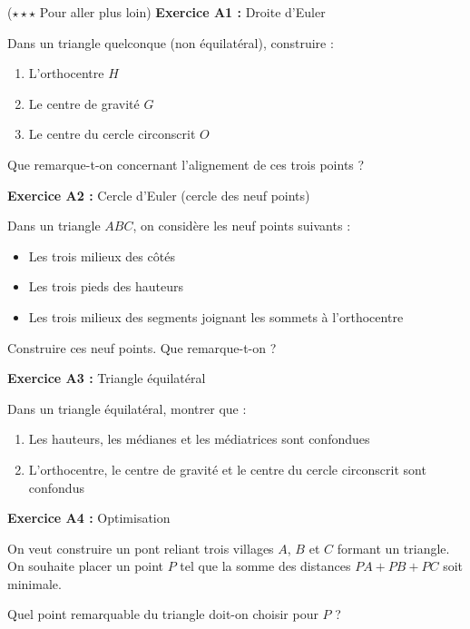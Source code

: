 \begin{exercisebox}[Approfondissement] ($\star\star\star$ Pour aller plus loin)
	\textbf{Exercice A1 :} Droite d'Euler

	Dans un triangle quelconque (non équilatéral), construire :
	\begin{enumerate}[label=\alph*)]
		\item L'orthocentre $H$
		\item Le centre de gravité $G$
		\item Le centre du cercle circonscrit $O$
	\end{enumerate}

	Que remarque-t-on concernant l'alignement de ces trois points ?


	\medskip

	\textbf{Exercice A2 :} Cercle d'Euler (cercle des neuf points)

	Dans un triangle $ABC$, on considère les neuf points suivants :
	\begin{itemize}
		\item Les trois milieux des côtés
		\item Les trois pieds des hauteurs
		\item Les trois milieux des segments joignant les sommets à l'orthocentre
	\end{itemize}

	Construire ces neuf points. Que remarque-t-on ?


	\medskip

	\textbf{Exercice A3 :} Triangle équilatéral

	Dans un triangle équilatéral, montrer que :
	\begin{enumerate}[label=\alph*)]
		\item Les hauteurs, les médianes et les médiatrices sont confondues
		\item L'orthocentre, le centre de gravité et le centre du cercle circonscrit sont confondus
	\end{enumerate}

	\medskip

	\textbf{Exercice A4 :} Optimisation

	On veut construire un pont reliant trois villages $A$, $B$ et $C$ formant un triangle. On souhaite placer un point $P$ tel que la somme des distances $PA + PB + PC$ soit minimale.

	Quel point remarquable du triangle doit-on choisir pour $P$ ?

\end{exercisebox}
